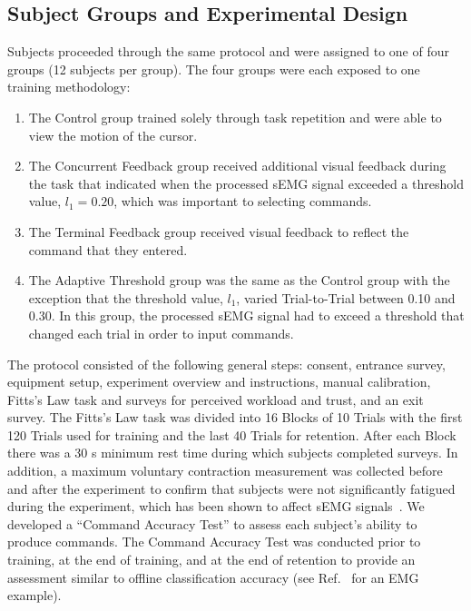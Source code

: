 \subsection{Subject Groups and Experimental Design}
Subjects proceeded through the same protocol and were assigned to one of four groups (12 subjects per group).
The four groups were each exposed to one training methodology:

\begin{enumerate}
	\item The Control group trained solely through task repetition and were able to view the motion of the cursor.
	\item The Concurrent Feedback group received additional visual feedback during the task that indicated when the processed sEMG signal exceeded a threshold value, $l_1=0.20$, which was important to selecting commands.
	\item The Terminal Feedback group received visual feedback to reflect the command that they entered.
	\item The Adaptive Threshold group was the same as the Control group with the exception that the threshold value, $l_1$, varied Trial-to-Trial between 0.10 and 0.30.
	      In this group, the processed sEMG signal had to exceed a threshold that changed each trial in order to input commands.
\end{enumerate}

The protocol consisted of the following general steps: consent, entrance survey, equipment setup, experiment overview and instructions, manual calibration, Fitts's Law task and surveys for perceived workload and trust, and an exit survey.
The Fitts's Law task was divided into 16 Blocks of 10 Trials with the first 120 Trials used for training and the last 40 Trials for retention.
After each Block there was a 30 s minimum rest time during which subjects completed surveys.
In addition, a maximum voluntary contraction measurement was collected before and after the experiment to confirm that subjects were not significantly fatigued during the experiment, which has been shown to affect sEMG signals~\cite{RN47}.
We developed a ``Command Accuracy Test'' to assess each subject's ability to produce commands.
The Command Accuracy Test was conducted prior to training, at the end of training, and at the end of retention to provide an assessment similar to offline classification accuracy (see Ref.~\cite{RN48} for an EMG example).

